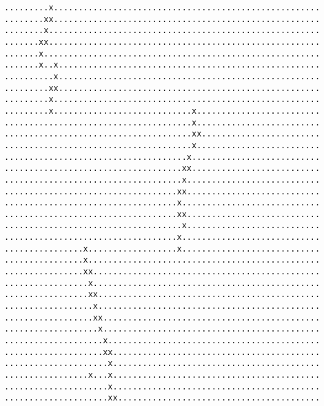{\begin{verbatim}
.........x......................................................
........xx......................................................
........x.......................................................
.......xx.......................................................
.......x........................................................
.......x..x.....................................................
..........x.....................................................
.........xx.....................................................
.........x......................................................
.........x............................x.........................
......................................x.........................
......................................xx........................
......................................x.........................
.....................................x..........................
....................................xx..........................
....................................x...........................
...................................xx...........................
...................................x............................
...................................xx...........................
....................................x...........................
...................................x............................
................x..................x............................
................x...............................................
................xx..............................................
.................x..............................................
.................xx.............................................
..................x.............................................
..................xx............................................
...................x............................................
....................x...........................................
....................xx..........................................
.....................x..........................................
.................x...x..........................................
.....................x..........................................
.....................xx.........................................\end{verbatim}
}
